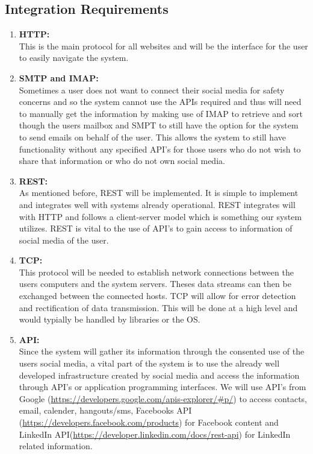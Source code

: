 \documentclass[hidelinks,english]{article}
\begin{document}
		\subsection{Integration Requirements}
			\begin{enumerate}
		        \item \textbf{HTTP:}\\
		            This is the main protocol for all websites and will be the interface for the user to easily navigate the system.
		        \item \textbf{SMTP and IMAP:}\\
		            Sometimes a user does not want to connect their social media for safety concerns and so the system cannot use the APIs required and thus will need to manually get the information by making use of IMAP to retrieve and sort though the users mailbox and SMPT to still have the option for the system to send emails on behalf of the user. This allows the system to still have functionality without any specified API's for those users who do not wish to share that information or who do not own social media.
		        \item \textbf{REST:}\\
		            As mentioned before, REST will be implemented. It is simple to implement and integrates well with systems already operational. REST integrates will with HTTP and follows a client-server model which is something our system utilizes. REST is vital to the use of API's to gain access to information of social media of the user.
		        \item \textbf{TCP:}\\
		            This protocol will be needed to establish network connections between the users computers and the system servers. Theses data streams can then be exchanged between the connected hosts. TCP will allow for error detection and rectification of data transmission. This will be done at a high level and would typially be handled by libraries or the OS.
		        \item \textbf{API:}\\
		            Since the system will gather its information through the consented use of the users social media, a vital part of the system is to use the already well developed infrastructure created by social media and access the information through API's or application programming interfaces. We will use API's from Google (\sloppy\url{https://developers.google.com/apis-explorer/\#p/}) to access contacts, email, calender, hangouts/sms, Facebooks API (\sloppy\url{https://developers.facebook.com/products}) for Facebook content and LinkedIn API(\sloppy\url{https://developer.linkedin.com/docs/rest-api}) for LinkedIn related information.
	    		\end{enumerate}
		
\end{document}
